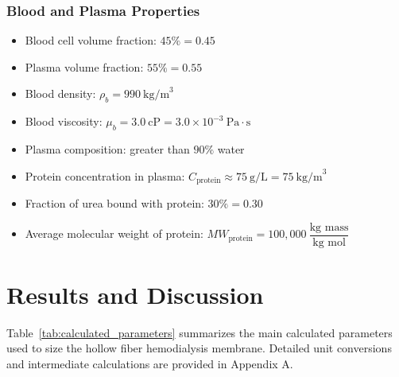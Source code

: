 \documentclass[10.5pt]{article}
\begin{document}
\vspace{-0.4cm}
\subsubsection{Blood and Plasma Properties}

\vspace{-0.2cm}
\begin{itemize}
    \setlength\itemsep{-0.15cm}

    \item Blood cell volume fraction: \(45\% = 0.45\)

    \item Plasma volume fraction: \(55\% = 0.55\)

    \item Blood density: 
    \(\rho_b = 990 \ \text{kg/m}^3\)

    \item Blood viscosity: 
    \(\mu_b = 3.0 \ \text{cP} = 3.0 \times 10^{-3} \ \text{Pa}\cdot\text{s}\)

    \item Plasma composition: greater than \(90\%\) water

    \item Protein concentration in plasma: 
    \(C_{\text{protein}} \approx 75 \ \text{g/L} = 75 \ \text{kg/m}^3\)

    \item Fraction of urea bound with protein: \(30\% = 0.30\)

    \item Average molecular weight of protein: 
    \(MW_{\text{protein}} = 100{,}000 \ \dfrac{\text{kg mass}}{\text{kg mol}}\)
\end{itemize}




\section{Results and Discussion}

Table~\ref{tab:calculated_parameters} summarizes the main calculated parameters used to size the hollow fiber hemodialysis membrane. Detailed unit conversions and intermediate calculations are provided in Appendix A.
\end{document}

